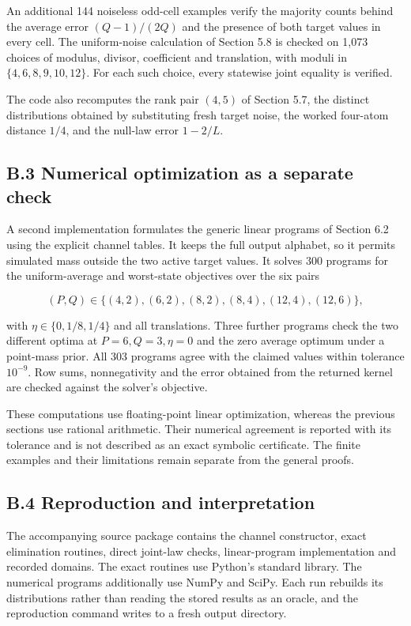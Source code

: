 \documentclass[
]{article}
\begin{document}
An additional 144 noiseless odd-cell examples verify the majority counts
behind the average error \((Q-1)/(2Q)\) and the presence of both target
values in every cell. The uniform-noise calculation of Section 5.8 is
checked on 1,073 choices of modulus, divisor, coefficient and
translation, with moduli in \(\{4,6,8,9,10,12\}\). For each such choice,
every statewise joint equality is verified.

The code also recomputes the rank pair \((4,5)\) of Section 5.7, the
distinct distributions obtained by substituting fresh target noise, the
worked four-atom distance \(1/4\), and the null-law error \(1-2/L\).

\subsection{B.3 Numerical optimization as a separate
check}\label{b.3-numerical-optimization-as-a-separate-check}

A second implementation formulates the generic linear programs of
Section 6.2 using the explicit channel tables. It keeps the full output
alphabet, so it permits simulated mass outside the two active target
values. It solves 300 programs for the uniform-average and worst-state
objectives over the six pairs

\[
(P,Q)\in\{(4,2),(6,2),(8,2),(8,4),(12,4),(12,6)\},
\]

with \(\eta\in\{0,1/8,1/4\}\) and all translations. Three further
programs check the two different optima at \(P=6,Q=3,\eta=0\) and the
zero average optimum under a point-mass prior. All 303 programs agree
with the claimed values within tolerance \(10^{-9}\). Row sums,
nonnegativity and the error obtained from the returned kernel are
checked against the solver's objective.

These computations use floating-point linear optimization, whereas the
previous sections use rational arithmetic. Their numerical agreement is
reported with its tolerance and is not described as an exact symbolic
certificate. The finite examples and their limitations remain separate
from the general proofs.

\subsection{B.4 Reproduction and
interpretation}\label{b.4-reproduction-and-interpretation}

The accompanying source package contains the channel constructor, exact
elimination routines, direct joint-law checks, linear-program
implementation and recorded domains. The exact routines use Python's
standard library. The numerical programs additionally use NumPy and
SciPy. Each run rebuilds its distributions rather than reading the
stored results as an oracle, and the reproduction command writes to a
fresh output directory.
\end{document}

